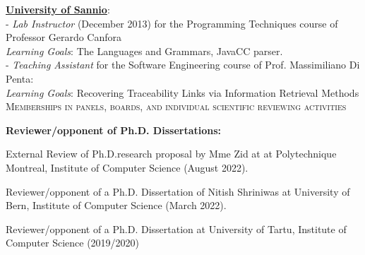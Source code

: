 \documentclass[11pt]{article}
\begin{document}
\href{http://www.unisa.it}{\textbf{University of Sannio}}:
\medskip\\
- \textit{Lab Instructor} (December 2013) for the Programming Techniques course of Professor Gerardo Canfora\\   \textit{Learning Goals}:   The Languages ​​and Grammars, JavaCC parser.\\
- \textit{Teaching Assistant } for the Software Engineering course of Prof. Massimiliano Di Penta:\\   \textit{Learning Goals}:   
Recovering Traceability Links via Information Retrieval Methods
\medskip\medskip \\
\textsc{Memberships in panels, boards, and individual scientific reviewing activities}

\medskip 

\textbf{Reviewer/opponent of Ph.D. Dissertations:}
\begin{innerlist}
   \item External Review of Ph.D.research proposal  by Mme Zid at at Polytechnique Montreal, Institute of Computer Science (August 2022).
   \item Reviewer/opponent of a Ph.D. Dissertation   of Nitish Shriniwas at University of Bern, Institute of Computer Science (March 2022).
   \item Reviewer/opponent of a Ph.D. Dissertation  at University of Tartu, Institute of Computer Science (2019/2020)
\end{innerlist}
\medskip 
\end{document}
